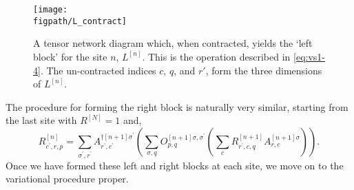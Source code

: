 \begin{figure}[ht!]
\centering
\texttt{[image: \\figpath/L\_contract]}
\caption{A tensor network diagram which, when contracted, yields the `left block' for the site \(n\), \(L^{[n]}\). This is the operation described in \cref{eq:vs1-4}. The un-contracted indices \(c\), \(q\), and \(r'\), form the three dimensions of \(L^{[n]}\).}
\label{fig:vs1-4}
\end{figure}

The procedure for forming the right block is naturally very similar, starting from the last site with \(R^{[N]} = 1\) and,
\begin{equation}
R^{[n]}_{c^{\prime}, r, p} = \sum_{\sigma^{\prime}, r^{\prime}} A^{\dagger [n+1] \sigma^{\prime}}_{r^{\prime}, c^{\prime}} \left( \sum_{\sigma, q} O^{[n+1] \sigma, \sigma^{\prime}}_{p, q} \left( \sum_{c} R^{[n+1]}_{r^{\prime}, c, q} A^{[n+1] \sigma}_{r, c} \right) \right).  
\label{eq:vs1-5}
\end{equation}
Once we have formed these left and right blocks at each site, we move on to the variational procedure proper. 

